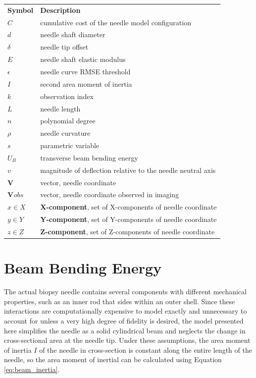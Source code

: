\begin{tabular}{@{}ll@{}} 
\textbf{Symbol} & \textbf{Description} \\
$C$ & cumulative cost of the needle model configuration \\
$d$ & needle shaft diameter \\
$\delta$ & needle tip offset \\
$E$ & needle shaft elastic modulus \\
$\epsilon$ & needle curve RMSE threshold \\
$I$ & second area moment of inertia \\
$k$ & observation index \\
$L$ & needle length \\
$n$ & polynomial degree \\
$\rho$ & needle curvature \\
$s$ & parametric variable \\
$U_B$ & transverse beam bending energy \\
$v $ & magnitude of deflection relative to the needle neutral axis \\
$\textbf{V}$ & vector, needle coordinate \\
$\textbf{V}_{}obs$ & vector, needle coordinate observed in imaging \\
$x \in X$ & \textbf{X-component}, set of X-components of needle coordinate \\
$y \in Y$ & \textbf{Y-component}, set of Y-components of needle coordinate \\
$z \in Z$ & \textbf{Z-component}, set of Z-components of needle coordinate \\

\end{tabular}

\section{Beam Bending Energy}
The actual biopsy needle contains several components with different mechanical properties, such as an inner rod that sides within an outer shell. Since these interactions are computationally expensive to model exactly and unnecessary to account for unless a very high degree of fidelity is desired, the model presented here simplifies the needle as a solid cylindrical beam and neglects the change in cross-sectional area at the needle tip. Under these assumptions, the area moment of inertia $I$ of the needle in cross-section is constant along the entire length of the needle, so the area moment of inertial can be calculated using Equation \ref{eq:beam_inertia}. 

